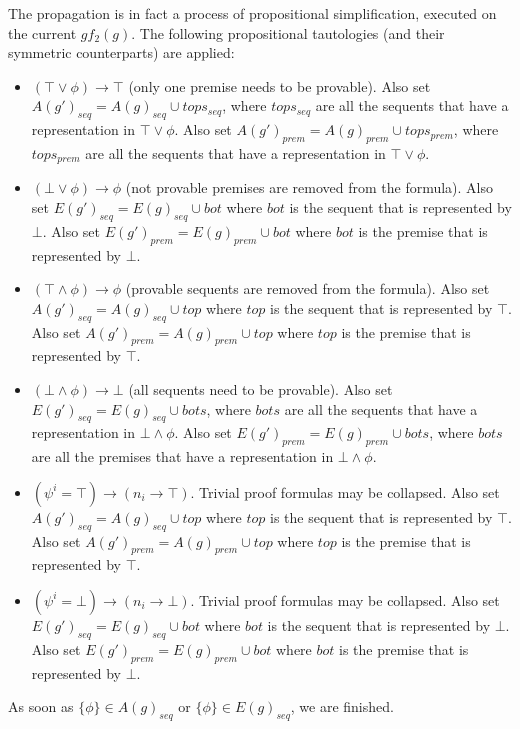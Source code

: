 \documentclass{llncs}
\begin{document}
The propagation is in fact a process of propositional simplification,
executed on the current $gf_2(g)$. The following propositional tautologies (and their symmetric
counterparts) are applied:
\begin{itemize}
\item $(\top\vee\phi)\rightarrow\top$ (only one premise needs to be provable). Also set $A(g')_{seq}=A(g)_{seq}\cup tops_{seq}$,
where $tops_{seq}$ are all the sequents that have a representation in $\top\vee\phi$. Also set $A(g')_{prem}=A(g)_{prem}\cup tops_{prem}$,
where $tops_{prem}$ are all the sequents that have a representation in $\top\vee\phi$.
\item $(\bot\vee\phi)\rightarrow\phi$ (not provable premises are removed from the formula). Also set $E(g')_{seq}=E(g)_{seq}\cup bot$ where $bot$
is the sequent that is represented by $\bot$. Also set $E(g')_{prem}=E(g)_{prem}\cup bot$ where $bot$
is the premise that is represented by $\bot$.
\item $(\top\wedge\phi)\rightarrow\phi$ (provable sequents are removed from the formula). Also set $A(g')_{seq}=A(g)_{seq}\cup top$ where $top$
is the sequent that is represented by $\top$. Also set $A(g')_{prem}=A(g)_{prem}\cup top$ where $top$
is the premise that is represented by $\top$.
\item $(\bot\wedge\phi)\rightarrow\bot$ (all sequents need to be provable). Also set $E(g')_{seq}=E(g)_{seq}\cup bots$, where $bots$ are all
the sequents that have a representation in $\bot\wedge\phi$. Also set $E(g')_{prem}=E(g)_{prem}\cup bots$, where $bots$ are all
the premises that have a representation in $\bot\wedge\phi$.
\item $(\psi^i=\top) \rightarrow (n_i \rightarrow \top)$. Trivial proof formulas may be collapsed. Also set $A(g')_{seq}=A(g)_{seq}\cup top$ where
$top$ is the sequent that is represented by $\top$. Also set $A(g')_{prem}=A(g)_{prem}\cup top$ where
$top$ is the premise that is represented by $\top$.
\item $(\psi^i=\bot) \rightarrow (n_i \rightarrow \bot)$. Trivial proof formulas may be collapsed. Also set $E(g')_{seq}=E(g)_{seq}\cup bot$ where $bot$
is the sequent that is represented by $\bot$. Also set $E(g')_{prem}=E(g)_{prem}\cup bot$ where $bot$
is the premise that is represented by $\bot$.
\end{itemize}

As soon as $\{\phi\}\in A(g)_{seq}$ or $\{\phi\}\in E(g)_{seq}$, we are finished.\\
\end{document}
